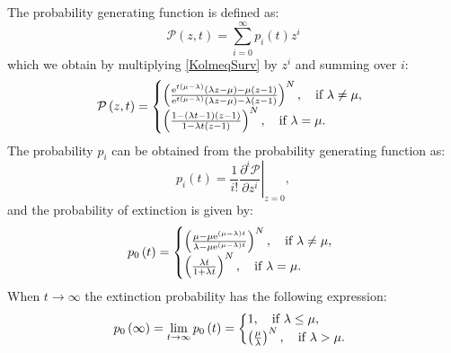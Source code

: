 \documentclass[11pt,a4paper]{article}
\newcommand{\e}{{\rm e}}
\begin{document}
The probability generating function is defined as:
\begin{equation*}
\mathcal{P}\left(z,t\right)=\sum_{i=0}^\infty p_i\left(t\right)z^i
\end{equation*}
which we obtain by multiplying \eqref{KolmeqSurv} by $z^i$ and summing over $i$:
\begin{align*}
\mathcal{P}\left(z,t\right)=\left\{
  \begin{array}{@{}ll@{}}
  \left(\frac{\e^{t\left(\mu-\lambda\right)}\left(\lambda z-\mu\right)-\mu\left(z-1\right)}{\e^{t\left(\mu-\lambda\right)}\left(\lambda z-\mu\right)-\lambda\left(z-1\right)}\right)^N,\quad \text{if }\lambda\neq\mu, \\
  \left(\frac{1-\left(\lambda t-1\right)\left(z-1\right)}{1-\lambda t\left(z-1\right)}\right)^N,\quad \text{if }\lambda=\mu.
  \end{array}\right.
\end{align*}
The probability $p_i$ can be obtained from the probability generating function as:
\begin{equation*}
p_i\left(t\right)=\left.\frac{1}{i!}\frac{\partial^i\mathcal{P}}{\partial z^i}\right|_{z=0},
\end{equation*}
and the probability of extinction is given by:
\begin{align*}
p_0\left(t\right)=\left\{
  \begin{array}{@{}ll@{}}
  \left(\frac{\mu-\mu\e^{\left(\mu-\lambda\right)t}}{\lambda-\mu\e^{\left(\mu-\lambda\right)t}}\right)^N,\quad \text{if }\lambda\neq\mu, \\
  \left(\frac{\lambda t}{1+\lambda t}\right)^N,\quad \text{if }\lambda=\mu.
  \end{array}\right.
\end{align*}
When $t\rightarrow\infty$ the extinction probability has the following expression:
\begin{align*}
p_0\left(\infty\right)=\lim_{t\rightarrow\infty}p_0\left(t\right)=\left\{
  \begin{array}{@{}ll@{}}
  1,\quad \text{if }\lambda\leq\mu, \\
  \left(\frac{\mu}{\lambda}\right)^N,\quad \text{if }\lambda>\mu.
  \end{array}\right.
\end{align*}
\end{document}
